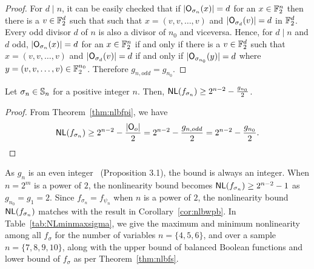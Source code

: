 \documentclass{llncs}
\begin{document}
\begin{proof}
For $d \mid n$, it can be easily checked that if $|\mathsf{O}_{\sigma_n}(x)| = d$ for an $x \in \mathbb{F}_2^n$ then there is a $v \in \mathbb{F}_2^d$ such that such that $x = (v,v, \ldots, v)$ and $|\mathsf{O}_{\sigma_d}(v)| = d$ in $\mathbb{F}_2^d$.
Every odd divisor $d$ of $n$ is also a divisor of $n_0$ and viceversa. 
Hence, for $d\mid n$ and $d$ odd, $|\mathsf{O}_{\sigma_n}(x)| = d$ for an $x\in \mathbb{F}_2^n$ if and only if there is a $v \in \mathbb{F}_2^d$ such that $x = (v,v, \ldots, v)$ and $|\mathsf{O}_{\sigma_d}(v)| = d$ if and only if $|\mathsf{O}_{\sigma_{n_0}}(y)| = d$ where $y = (v,v, \ldots, v) \in \mathbb{F}_2^{n_0}$. 
Therefore $g_{n,odd} = g_{n_0}$.
\end{proof}



\begin{theorem}\label{thm:nlbfs}
Let $\sigma_n \in \mathbb{S}_n$ for a positive integer $n$.
Then, $\mathsf{NL}(f_{\sigma_n}) \ge 2^{n-2} - \frac{g_{n_0}}{2}$.
\end{theorem}
\begin{proof}
From Theorem~\ref{thm:nlbfpi}, we have
$$\mathsf{NL}(f_{\sigma_n}) \ge 2^{n-2} - \frac{|\mathsf{O}_o|}{2} = 2^{n-2} - \frac{g_{n,odd}}{2} = 2^{n-2} - \frac{g_{n_0}}{2}.$$
\end{proof}
As $g_n$ is an even integer~\cite{DM:CI18} (Proposition 3.1), the bound is always an integer. 
When $n = 2^m$ is a power of $2$, the nonlinearity bound becomes $\mathsf{NL}(f_{\sigma_n}) \ge 2^{n-2} - 1$ as $g_{n_0} = g_1 = 2$. 
Since $f_{\sigma_n} = f_{\psi_n}$ when $n$ is a power of $2$, the nonlinearity bound $\mathsf{NL}(f_{\sigma_n})$ matches with the result in Corollary~\ref{cor:nlbwpb}. 
In Table~\ref{tab:NLminmaxsigma}, we give the maximum and minimum nonlinearity among all $f_\sigma$ for the number of variables $n = \{4, 5, 6\}$, and over a sample $n = \{7, 8, 9, 10\}$, along with the upper bound of balanced Boolean functions and lower bound of $f_{\sigma}$ as per Theorem~\ref{thm:nlbfs}.
\end{document}
